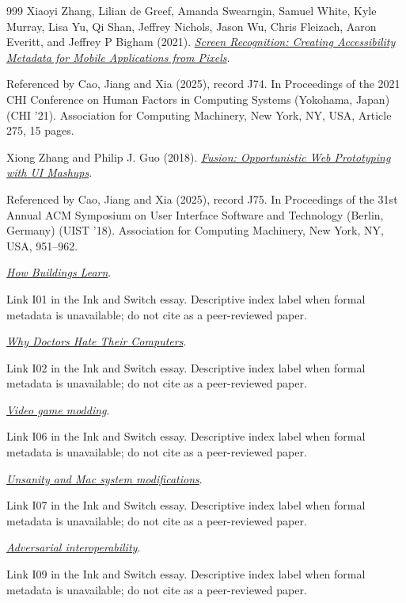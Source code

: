 \documentclass[11pt,letterpaper]{article}
\begin{document}
\begin{thebibliography}{999}
Xiaoyi Zhang, Lilian de Greef, Amanda Swearngin, Samuel White, Kyle Murray, Lisa Yu, Qi Shan, Jeffrey Nichols, Jason Wu, Chris Fleizach, Aaron Everitt, and Jeffrey P Bigham (2021).
\href{https://doi.org/10.1145/3411764.3445186}{\emph{Screen Recognition: Creating Accessibility Metadata for Mobile Applications from Pixels}}.
\par {\small Referenced by Cao, Jiang and Xia (2025), record J74. In Proceedings of the 2021 CHI Conference on Human Factors in Computing Systems (Yokohama, Japan) (CHI ’21). Association for Computing Machinery, New York, NY, USA, Article 275, 15 pages.}

Xiong Zhang and Philip J. Guo (2018).
\href{https://doi.org/10.1145/3242587.3242632}{\emph{Fusion: Opportunistic Web Prototyping with UI Mashups}}.
\par {\small Referenced by Cao, Jiang and Xia (2025), record J75. In Proceedings of the 31st Annual ACM Symposium on User Interface Software and Technology (Berlin, Germany) (UIST ’18). Association for Computing Machinery, New York, NY, USA, 951–962.}

\href{https://en.wikipedia.org/wiki/How_Buildings_Learn}{\emph{How Buildings Learn}}.
\par {\small Link I01 in the Ink and Switch essay. Descriptive index label when formal metadata is unavailable; do not cite as a peer-reviewed paper.}

\href{https://www.newyorker.com/magazine/2018/11/12/why-doctors-hate-their-computers}{\emph{Why Doctors Hate Their Computers}}.
\par {\small Link I02 in the Ink and Switch essay. Descriptive index label when formal metadata is unavailable; do not cite as a peer-reviewed paper.}

\href{https://en.wikipedia.org/wiki/Video_game_modding}{\emph{Video game modding}}.
\par {\small Link I06 in the Ink and Switch essay. Descriptive index label when formal metadata is unavailable; do not cite as a peer-reviewed paper.}

\href{https://en.wikipedia.org/wiki/Unsanity}{\emph{Unsanity and Mac system modifications}}.
\par {\small Link I07 in the Ink and Switch essay. Descriptive index label when formal metadata is unavailable; do not cite as a peer-reviewed paper.}

\href{https://www.eff.org/deeplinks/2019/10/adversarial-interoperability}{\emph{Adversarial interoperability}}.
\par {\small Link I09 in the Ink and Switch essay. Descriptive index label when formal metadata is unavailable; do not cite as a peer-reviewed paper.}


\end{thebibliography}
\end{document}
